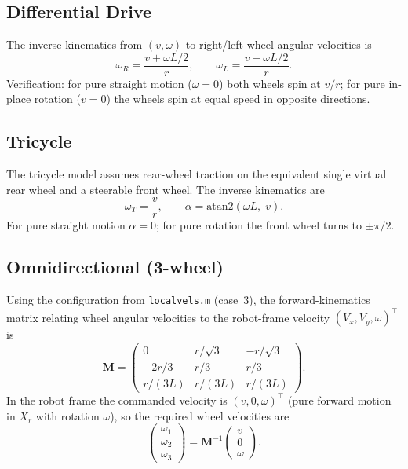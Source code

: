 \documentclass[a4paper,11pt]{report}
\begin{document}
\subsection{Differential Drive}

The inverse kinematics from $(v, \omega)$ to right/left wheel angular velocities is
\begin{equation}
  \omega_R = \frac{v + \omega L/2}{r}, \qquad
  \omega_L = \frac{v - \omega L/2}{r}.
  \label{eq:dd_ik}
\end{equation}
Verification: for pure straight motion ($\omega = 0$) both wheels spin at $v/r$; for pure in-place rotation ($v = 0$) the wheels spin at equal speed in opposite directions.

\subsection{Tricycle}

The tricycle model assumes rear-wheel traction on the equivalent single virtual rear wheel and a steerable front wheel.  The inverse kinematics are
\begin{equation}
  \omega_T = \frac{v}{r}, \qquad
  \alpha = \mathrm{atan2}(\omega L,\; v).
  \label{eq:tri_ik}
\end{equation}
For pure straight motion $\alpha = 0$; for pure rotation the front wheel turns to $\pm\pi/2$.

\subsection{Omnidirectional (3-wheel)}

Using the configuration from \texttt{localvels.m} (case~3), the forward-kinematics matrix relating wheel angular velocities to the robot-frame velocity $(V_x, V_y, \omega)^\top$ is
\begin{equation}
  \mathbf{M} = \begin{pmatrix}
    0            &  r/\sqrt{3}  & -r/\sqrt{3} \\
   -2r/3         &  r/3         &  r/3        \\
    r/(3L)       &  r/(3L)      &  r/(3L)
  \end{pmatrix}.
  \label{eq:omni_M}
\end{equation}
In the robot frame the commanded velocity is $(v, 0, \omega)^\top$ (pure forward motion in $X_r$ with rotation $\omega$), so the required wheel velocities are
\begin{equation}
  \begin{pmatrix}\omega_1\\\omega_2\\\omega_3\end{pmatrix}
  = \mathbf{M}^{-1}\begin{pmatrix}v\\0\\\omega\end{pmatrix}.
  \label{eq:omni_ik}
\end{equation}
\end{document}
